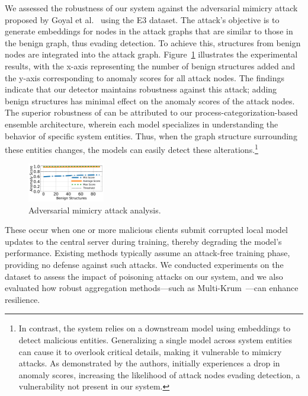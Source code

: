  We assessed the robustness of our system against the adversarial mimicry attack proposed by Goyal et al.~\cite{goyal2023sometimes} using the E3 dataset. The attack's objective is to generate embeddings for nodes in the attack graphs that are similar to those in the benign graph, thus evading detection. To achieve this, structures from benign nodes are integrated into the attack graph. Figure~\ref{mimicryattack} illustrates the experimental results, with the x-axis representing the number of benign structures added and the y-axis corresponding to anomaly scores for all attack nodes. The findings indicate that our detector maintains robustness against this attack; adding benign structures has minimal effect on the anomaly scores of the attack nodes. The superior robustness of \Sys can be attributed to our process-categorization-based ensemble \gnnshort architecture, wherein each model specializes in understanding the behavior of specific system entities. Thus, when the graph structure surrounding these entities changes, the models can easily detect these alterations.\footnote{In contrast, the \flash system relies on a downstream model using \gnnshort embeddings to detect malicious entities. Generalizing a single model across system entities can cause it to overlook critical details, making it vulnerable to mimicry attacks. As demonstrated by the authors, \flash initially experiences a drop in anomaly scores, increasing the likelihood of attack nodes evading detection, a vulnerability not present in our system.}

\begin{figure}[!t]
    \centering
    \includegraphics[width=0.3\textwidth]{fig/adversarial.pdf}
    \caption{Adversarial mimicry attack analysis.}
    \label{mimicryattack}
    \vspace{-2ex}
  \end{figure}


 These occur when one or more malicious clients submit corrupted local model updates to the central server during training, thereby degrading the model’s performance. Existing methods typically assume an attack-free training phase, providing no defense against such attacks. We conducted experiments on the \optc dataset to assess the impact of poisoning attacks on our system, and we also evaluated how robust aggregation methods—such as Multi-Krum~\cite{munoz2019byzantine}—can enhance resilience.

